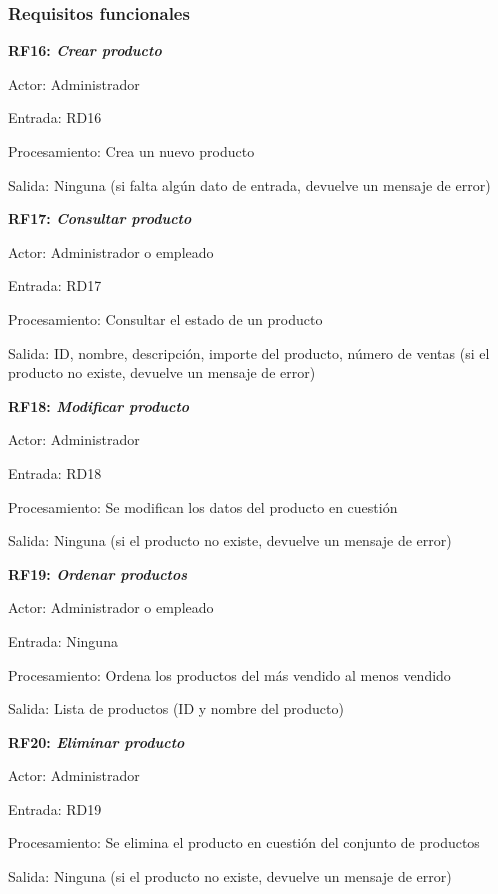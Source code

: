 \documentclass[paper=a4, fontsize=11pt, spanish]{scrartcl}
\begin{document}
\subsubsection{Requisitos funcionales}
\setlength{\parindent}{0em}
\textbf{RF16: \textit{Crear producto}}
\setlength{\parindent}{2em}

Actor: Administrador

Entrada: RD16

Procesamiento: Crea un nuevo producto

Salida: Ninguna (si falta algún dato de entrada, devuelve un mensaje de error)

\setlength{\parindent}{0em}
\textbf{RF17: \textit{Consultar producto}}
\setlength{\parindent}{2em}

Actor: Administrador o empleado

Entrada: RD17

Procesamiento: Consultar el estado de un producto

Salida: ID, nombre, descripción, importe del producto, número de ventas (si el producto no existe, devuelve un mensaje de error)

\setlength{\parindent}{0em}
\textbf{RF18: \textit{Modificar producto}}
\setlength{\parindent}{2em}

Actor: Administrador

Entrada: RD18

Procesamiento: Se modifican los datos del producto en cuestión

Salida: Ninguna (si el producto no existe, devuelve un mensaje de error)

\setlength{\parindent}{0em}
\textbf{RF19: \textit{Ordenar productos}}
\setlength{\parindent}{2em}

Actor: Administrador o empleado

Entrada: Ninguna

Procesamiento: Ordena los productos del más vendido al menos vendido

Salida: Lista de productos (ID y nombre del producto)

\setlength{\parindent}{0em}
\textbf{RF20: \textit{Eliminar producto}}
\setlength{\parindent}{2em}

Actor: Administrador

Entrada: RD19

Procesamiento: Se elimina el producto en cuestión del conjunto de productos 

Salida: Ninguna (si el producto no existe, devuelve un mensaje de error)
\end{document}
